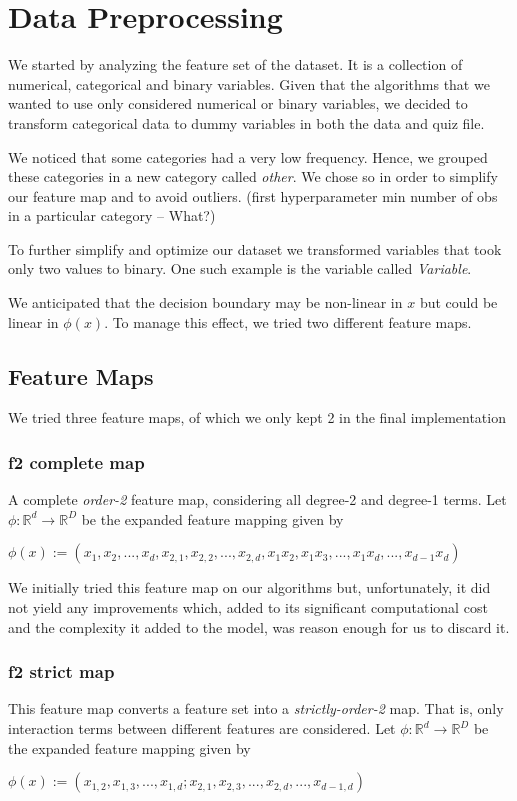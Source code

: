\chapter{Data Preprocessing}
We started by analyzing the feature set of the dataset. It is a collection of numerical, categorical and binary variables.
Given that the algorithms that we wanted to use only considered numerical or binary variables, we decided to transform categorical data to dummy variables in both the data and quiz file.

We noticed that some categories had a very low frequency. Hence, we grouped these categories in a new category called \textit{other}. We chose so in order to simplify our feature map and to avoid outliers.  (first hyperparameter min number of obs in a particular category -- What?) 

To further simplify and optimize our dataset we transformed variables that took only two values to binary. One such example is the variable called \textit{Variable}.

We anticipated that the decision boundary may be non-linear in $x$ but could be linear in $\phi(x)$.
To manage this effect, we tried two different feature maps.


\section{Feature Maps}
We tried three feature maps, of which we only kept 2 in the final implementation
\subsection{f2 complete map}
A complete \textit{order-2} feature map, considering all degree-2 and degree-1 terms. Let 
$\phi : \mathbb{R}^d \rightarrow \mathbb{R}^D$ be the expanded feature mapping given by 
\begin{center}
$\phi(x) := (x_1, x_2, ... , x_d, x_{2,1}, x_{2,2}, ... , x_{2,d}, x_1x_2, x_1x_3, ... , x_1x_d, ... ,x_{d-1}x_d)$
 \end{center}
 
We initially tried this feature map on our algorithms but, unfortunately, it did not yield any improvements which, added to its significant computational cost and the complexity it added to the model, was reason enough for us to discard it.

\subsection{f2 strict map}
 This feature map converts a feature set into a \textit{strictly-order-2} map. That is, only interaction terms between different features are considered. Let $\phi : \mathbb{R}^d \rightarrow \mathbb{R}^D$ be the expanded feature mapping given by \newline
 \begin{center}
 $\phi(x) := (x_{1,2}, x_{1,3}, ... , x_{1,d}; x_{2,1}, x_{2,3}, ... , x_{2,d}, ... ,x_{d-1,d}) $
 \end{center}

